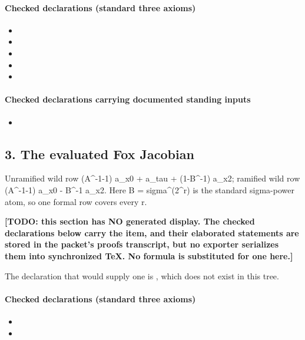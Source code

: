 \paragraph{Checked declarations (standard three axioms)}
\begin{itemize}
\item {}
\item {}
\item {}
\item {}
\item {}
\end{itemize}
\paragraph{Checked declarations carrying documented standing inputs}
\begin{itemize}
\item {}
\end{itemize}

\subsection*{3. The evaluated Fox Jacobian}
Unramified wild row (A\textasciicircum{}-1-1) a\_x0 + a\_tau + (1-B\textasciicircum{}-1) a\_x2; ramified wild row (A\textasciicircum{}-1-1) a\_x0 - B\textasciicircum{}-1 a\_x2. Here B = sigma\textasciicircum{}(2\textasciicircum{}r) is the standard sigma-power atom, so one formal row covers every r.

\par\noindent\textbf{[TODO: this section has NO generated display. The checked declarations below carry the item, and their elaborated statements are stored in the packet's proofs transcript, but no exporter serializes them into synchronized TeX. No formula is substituted for one here.]}
\par\noindent The declaration that would supply one is , which does not exist in this tree.
\paragraph{Checked declarations (standard three axioms)}
\begin{itemize}
\item {}
\item {}
\end{itemize}

